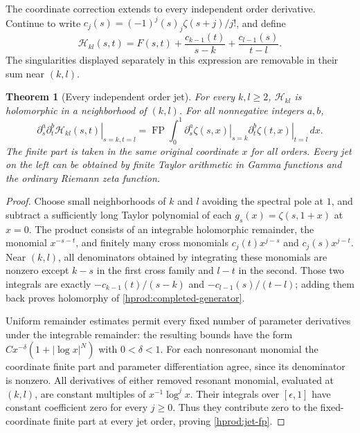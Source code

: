 \documentclass[11pt,a4paper]{article}
\numberwithin{equation}{section}
\newtheorem{theorem}{Theorem}[section]
\theoremstyle{definition}
\theoremstyle{remark}
\begin{document}
The coordinate correction extends to every independent order derivative.
Continue to write
$c_j(s)=(-1)^j(s)_j\zeta(s+j)/j!$, and define
\begin{equation}\label{hprod:completed-generator}
 \mathscr H_{kl}(s,t)=F(s,t)
 +\frac{c_{k-1}(t)}{s-k}+\frac{c_{l-1}(s)}{t-l}.
\end{equation}
The singularities displayed separately in this expression are removable
in their sum near $(k,l)$.

\begin{theorem}[Every independent order jet]
\label{hprod:all-jets}
For every $k,l\ge2$, $\mathscr H_{kl}$ is holomorphic in a
neighborhood of $(k,l)$.  For all nonnegative integers $a,b$,
\begin{equation}\label{hprod:jet-fp}
 \left.\partial_s^a\partial_t^b\mathscr H_{kl}(s,t)
 \right|_{s=k,t=l}
 =\operatorname{FP}\int_0^1
 \left.\partial_s^a\zeta(s,x)\right|_{s=k}
 \left.\partial_t^b\zeta(t,x)\right|_{t=l}\,dx.
\end{equation}
The finite part is taken in the same original coordinate $x$ for all
orders.  Every jet on the left can be obtained by finite Taylor
arithmetic in Gamma functions and the ordinary Riemann zeta function.
\end{theorem}

\begin{proof}
Choose small neighborhoods of $k$ and $l$ avoiding the spectral pole at
$1$, and subtract a sufficiently
long Taylor polynomial of each $g_s(x)=\zeta(s,1+x)$ at $x=0$.
The product consists of an integrable holomorphic remainder, the
monomial $x^{-s-t}$, and finitely many cross monomials
$c_j(t)x^{j-s}$ and $c_j(s)x^{j-t}$.  Near $(k,l)$, all
denominators obtained by integrating these monomials are nonzero
except $k-s$ in the first cross family and $l-t$ in the second.
Those two integrals are exactly
$-c_{k-1}(t)/(s-k)$ and $-c_{l-1}(s)/(t-l)$; adding them
back proves holomorphy of \eqref{hprod:completed-generator}.

Uniform remainder estimates permit every fixed number of parameter
derivatives under the integrable remainder: the resulting bounds have
the form $C x^{-\delta}(1+|\log x|^N)$ with $0<\delta<1$.
For each nonresonant monomial the coordinate finite part and parameter
differentiation agree, since its denominator is nonzero.  All derivatives
of either removed resonant monomial, evaluated at $(k,l)$, are
constant multiples of $x^{-1}\log^j x$.  Their integrals over
$[\epsilon,1]$ have constant coefficient zero for every $j\ge0$.
Thus they contribute zero to the fixed-coordinate finite part at every
jet order, proving \eqref{hprod:jet-fp}.
\end{proof}
\end{document}
